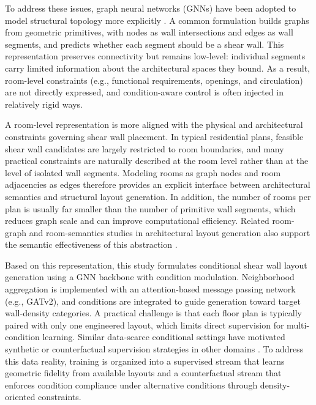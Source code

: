 To address these issues, graph neural networks (GNNs) have been adopted to model structural topology more explicitly \cite{Bronstein_2017,Wu_2021,Hamilton_2020,zhaoIntelligentDesignShear2023b,zhaoDesignconditioninformedShearWall2023d}. A common formulation builds graphs from geometric primitives, with nodes as wall intersections and edges as wall segments, and predicts whether each segment should be a shear wall. This representation preserves connectivity but remains low-level: individual segments carry limited information about the architectural spaces they bound. As a result, room-level constraints (e.g., functional requirements, openings, and circulation) are not directly expressed, and condition-aware control is often injected in relatively rigid ways.

A room-level representation is more aligned with the physical and architectural constraints governing shear wall placement. In typical residential plans, feasible shear wall candidates are largely restricted to room boundaries, and many practical constraints are naturally described at the room level rather than at the level of isolated wall segments. Modeling rooms as graph nodes and room adjacencies as edges therefore provides an explicit interface between architectural semantics and structural layout generation. In addition, the number of rooms per plan is usually far smaller than the number of primitive wall segments, which reduces graph scale and can improve computational efficiency. Related room-graph and room-semantics studies in architectural layout generation also support the semantic effectiveness of this abstraction \cite{nauataHouseGANRelationalGenerative2020,huGraph2PlanLearningFloorplan2020,Wang_2022}.

Based on this representation, this study formulates conditional shear wall layout generation using a GNN backbone with condition modulation. Neighborhood aggregation is implemented with an attention-based message passing network (e.g., GATv2), and conditions are integrated to guide generation toward target wall-density categories. A practical challenge is that each floor plan is typically paired with only one engineered layout, which limits direct supervision for multi-condition learning. Similar data-scarce conditional settings have motivated synthetic or counterfactual supervision strategies in other domains \cite{dasConditionalSyntheticData2022,chenCounterfactualSamplesSynthesizing2023,pavlloControllingStyleSemantics2020}. To address this data reality, training is organized into a supervised stream that learns geometric fidelity from available layouts and a counterfactual stream that enforces condition compliance under alternative conditions through density-oriented constraints.

